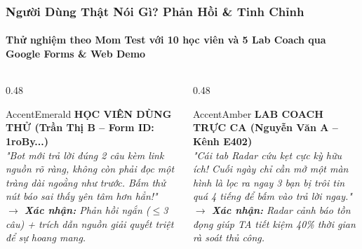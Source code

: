 \documentclass[aspectratio=169,10pt]{beamer}
\begin{document}
\begin{frame}
  \frametitle{Người Dùng Thật Nói Gì? Phản Hồi \& Tinh Chỉnh}
  \framesubtitle{Thử nghiệm theo Mom Test với 10 học viên và 5 Lab Coach qua Google Forms \& Web Demo}

  \begin{columns}[T]
    \begin{column}{0.48\textwidth}
      \begin{glassbox}{AccentEmerald}
        {\scriptsize \textbf{\color{AccentEmerald}HỌC VIÊN DÙNG THỬ (Trần Thị B -- Form ID: 1roBy...)}}\\[0.1cm]
        \footnotesize \itshape
        "Bot mới trả lời đúng 2 câu kèm link nguồn rõ ràng, không còn phải đọc một tràng dài ngoằng như trước. Bấm thử nút báo sai thấy yên tâm hơn hẳn!"\\[0.1cm]
        \tiny \normalfont \color{TextMuted}
        $\rightarrow$ \textbf{Xác nhận:} Phản hồi ngắn ($\le$3 câu) + trích dẫn nguồn giải quyết triệt để sự hoang mang.
      \end{glassbox}
    \end{column}
    \begin{column}{0.48\textwidth}
      \begin{glassbox}{AccentAmber}
        {\scriptsize \textbf{\color{AccentAmber}LAB COACH TRỰC CA (Nguyễn Văn A -- Kênh E402)}}\\[0.1cm]
        \footnotesize \itshape
        "Cái tab Radar cứu kẹt cực kỳ hữu ích! Cuối ngày chỉ cần mở một màn hình là lọc ra ngay 3 bạn bị trôi tin quá 4 tiếng để bấm vào trả lời ngay."\\[0.1cm]
        \tiny \normalfont \color{TextMuted}
        $\rightarrow$ \textbf{Xác nhận:} Radar cảnh báo tồn đọng giúp TA tiết kiệm 40\% thời gian rà soát thủ công.
      \end{glassbox}
    \end{column}
  \end{columns}


\end{frame}
\end{document}
